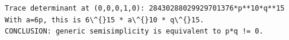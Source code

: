 \documentclass[11pt]{article}
\makeatletter
\newcommand{\boxspacing}{\kern\kvtcb@left@rule\kern\kvtcb@boxsep}
\newcommand{\prompt}[4]{
        {\ttfamily\llap{{\color{#2}[#3]:\hspace{3pt}#4}}\vspace{-\baselineskip}}
    }
\makeatother
\begin{document}
    \begin{Verbatim}[commandchars=\\\{\}]
Trace determinant at (0,0,0,1,0): 28430288029929701376*p**10*q**15
With a=6p, this is 6\^{}15 * a\^{}10 * q\^{}15.
CONCLUSION: generic semisimplicity is equivalent to p*q != 0.
    \end{Verbatim}

    \begin{tcolorbox}[breakable, size=fbox, boxrule=1pt, pad at break*=1mm,colback=cellbackground, colframe=cellborder]
\prompt{In}{incolor}{ }{\boxspacing}
\begin{Verbatim}[commandchars=\\\{\}]

\end{Verbatim}
\end{tcolorbox}


    
    
    
\end{document}
